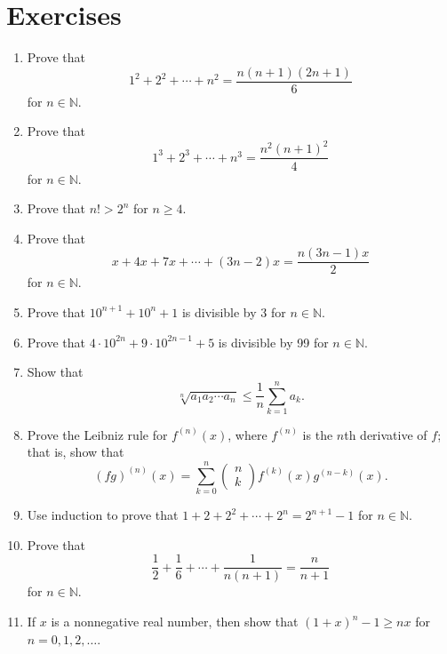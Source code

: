 \section*{Exercises}
\exrule

{\small
 
\begin{enumerate}
 
\item
Prove that
$$
1^2 + 2^2 + \cdots + n^2 = \frac{n(n + 1)(2n + 1)}{6}
$$
for $n \in {\mathbb N}$.

\item
Prove that
$$
1^3 + 2^3 + \cdots + n^3 = \frac{n^2(n + 1)^2}{4}
$$
for $n \in {\mathbb N}$.

\item
Prove that $n! > 2^n$ for $n \geq 4$.

\item
Prove that
$$
x + 4x + 7x + \cdots + (3n-2)x = \frac{n(3n - 1)x}{2}
$$
for $n \in {\mathbb N}$.

\item
Prove that $10^{n + 1} + 10^n + 1$ is divisible by 3 for $n \in {\mathbb N}$.

\item
Prove that $4 \cdot 10^{2n} + 9 \cdot 10^{2n - 1} + 5$ is divisible by 99 for $n \in {\mathbb N}$.

\item
Show that
$$
\sqrt[n]{a_1 a_2 \cdots a_n} \leq \frac{1}{n} \sum_{k = 1}^{n} a_k.
$$

\item
Prove the Leibniz rule for $f^{(n)} (x)$, where $f^{(n)}$ is the $n$th derivative of $f$; that is, show that 
$$
(fg)^{(n)} (x) = \sum_{k=0}^{n}
\left(
\begin{array}{c}
n \\ k
\end{array}
\right)
f^{(k)}(x) g^{(n-k)} (x).
$$

\item
Use induction to prove that $1 + 2 + 2^2 + \cdots + 2^n = 2^{n + 1} - 1$ for $n \in {\mathbb N}$. 

\item 
Prove that
$$
\frac{1}{2}+ \frac{1}{6} + \cdots + \frac{1}{n(n + 1)} = \frac{n}{n + 1} 
$$
for $n \in {\mathbb N}$.

\item 
If $x$ is a nonnegative real number, then show that $(1 + x)^n - 1 \geq nx$ for $n = 0, 1, 2, \ldots$. 
 

\end{enumerate}}
